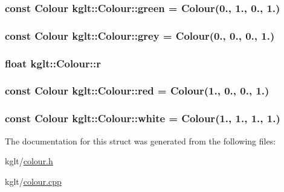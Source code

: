 \hypertarget{structkglt_1_1_colour_a50badab251d0583dccd5e0892e9cdc02}{
\subsubsection[{green}]{\setlength{\rightskip}{0pt plus 5cm}const {\bf Colour} kglt\-::\-Colour\-::green = {\bf Colour}(0., 1., 0., 1.)\hspace{0.3cm}{\ttfamily [static]}}}\label{structkglt_1_1_colour_a50badab251d0583dccd5e0892e9cdc02}
\hypertarget{structkglt_1_1_colour_a3c7750e3d02c1d9f65baafb91ed8b455}{
\subsubsection[{grey}]{\setlength{\rightskip}{0pt plus 5cm}const {\bf Colour} kglt\-::\-Colour\-::grey = {\bf Colour}(0., 0., 0., 1.)\hspace{0.3cm}{\ttfamily [static]}}}\label{structkglt_1_1_colour_a3c7750e3d02c1d9f65baafb91ed8b455}
\hypertarget{structkglt_1_1_colour_ae1ce44c240711d729ea042c198ecb6d4}{
\subsubsection[{r}]{\setlength{\rightskip}{0pt plus 5cm}float kglt\-::\-Colour\-::r}}\label{structkglt_1_1_colour_ae1ce44c240711d729ea042c198ecb6d4}
\hypertarget{structkglt_1_1_colour_a26163cb6ecb152c434c4f736cf6b8510}{
\subsubsection[{red}]{\setlength{\rightskip}{0pt plus 5cm}const {\bf Colour} kglt\-::\-Colour\-::red = {\bf Colour}(1., 0., 0., 1.)\hspace{0.3cm}{\ttfamily [static]}}}\label{structkglt_1_1_colour_a26163cb6ecb152c434c4f736cf6b8510}
\hypertarget{structkglt_1_1_colour_a6270d1bd69cade4ff78ea7ee89f7260f}{
\subsubsection[{white}]{\setlength{\rightskip}{0pt plus 5cm}const {\bf Colour} kglt\-::\-Colour\-::white = {\bf Colour}(1., 1., 1., 1.)\hspace{0.3cm}{\ttfamily [static]}}}\label{structkglt_1_1_colour_a6270d1bd69cade4ff78ea7ee89f7260f}


The documentation for this struct was generated from the following files\-:\begin{DoxyCompactItemize}
\item 
kglt/\hyperlink{colour_8h}{colour.\-h}\item 
kglt/\hyperlink{colour_8cpp}{colour.\-cpp}\end{DoxyCompactItemize}
